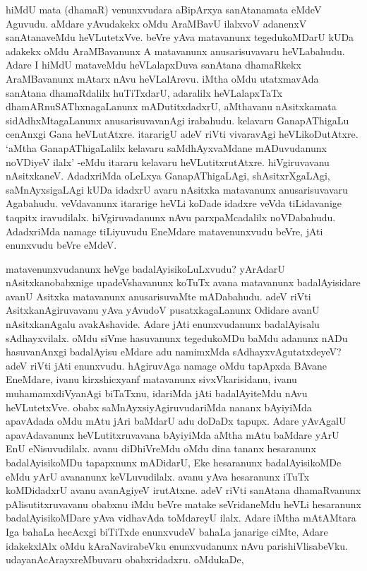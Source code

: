 hiMdU mata (dhamaR) venunxvudara aBipArxya sanAtanamata eMdeV Aguvudu. aMdare yAvudakekx oMdu AraMBavU ilalxvoV adanenxV sanAtanaveMdu heVLutetxVve. beVre yAva matavanunx tegedukoMDarU kUDa adakekx oMdu AraMBavanunx A matavanunx anusarisuvavaru heVLabahudu. Adare I hiMdU mataveMdu heVLalapxDuva sanAtana dhamaRkekx AraMBavanunx mAtarx nAvu heVLalArevu. iMtha oMdu utatxmavAda sanAtana dhamaRdalilx huTiTxdarU, adaralilx heVLalapxTaTx dhamARnuSAThxnagaLanunx mADutitxdadxrU, aMthavanu nAsitxkamata sidAdhxMtagaLanunx anusarisuvavanAgi irabahudu. kelavaru GanapAThigaLu cenAnxgi Gana heVLutAtxre. itararigU adeV riVti vivaravAgi heVLikoDutAtxre. `aMtha GanapAThigaLalilx kelavaru saMdhAyxvaMdane mADuvudanunx noVDiyeV ilalx' -eMdu itararu kelavaru heVLutitxrutAtxre. hiVgiruvavanu nAsitxkaneV. AdadxriMda oLeLxya GanapAThigaLAgi, shAsitxrXgaLAgi, saMnAyxsigaLAgi kUDa idadxrU avaru nAsitxka matavanunx anusarisuvavaru Agabahudu. veVdavanunx itararige heVLi koDade idadxre veVda tiLidavanige taqpitx iravudilalx. hiVgiruvadanunx nAvu parxpaMcadalilx noVDabahudu. AdadxriMda namage tiLiyuvudu EneMdare matavenunxvudu beVre, jAti enunxvudu beVre eMdeV.

matavenunxvudanunx heVge badalAyisikoLuLxvudu? yArAdarU nAsitxkanobabxnige upadeVshavanunx koTuTx avana matavanunx badalAyisidare avanU Asitxka matavanunx anusarisuvaMte mADabahudu. adeV riVti AsitxkanAgiruvavanu yAva yAvudoV pusatxkagaLanunx Odidare avanU nAsitxkanAgalu avakAshavide. Adare jAti enunxvudanunx badalAyisalu sAdhayxvilalx. oMdu siVme hasuvanunx tegedukoMDu baMdu adanunx nADu hasuvanAnxgi badalAyisu eMdare adu namimxMda sAdhayxvAgutatxdeyeV? adeV riVti jAti enunxvudu. hAgiruvAga namage oMdu tapApxda BAvane EneMdare, ivanu kirxshicxyanf matavanunx sivxVkarisidanu, ivanu muhamamxdiVyanAgi biTaTxnu, idariMda jAti badalAyiteMdu nAvu heVLutetxVve. obabx saMnAyxsiyAgiruvudariMda nananx bAyiyiMda apavAdada oMdu mAtu jAri baMdarU adu doDaDx tapupx. Adare yAvAgalU apavAdavanunx heVLutitxruvavana bAyiyiMda aMtha mAtu baMdare yArU EnU eNisuvudilalx. avanu diDhiVreMdu oMdu dina tananx hesaranunx badalAyisikoMDu tapapxnunx mADidarU, Eke hesaranunx badalAyisikoMDe eMdu yArU avananunx keVLuvudilalx. avanu yAva hesaranunx iTuTx koMDidadxrU avanu avanAgiyeV irutAtxne. adeV riVti sanAtana dhamaRvanunx pAlisutitxruvavanu obabxnu iMdu beVre matake seVridaneMdu heVLi hesaranunx badalAyisikoMDare yAva vidhavAda toMdareyU ilalx. Adare iMtha mAtAMtara Iga bahaLa hecAcxgi biTiTxde enunxvudeV bahaLa janarige ciMte, Adare idakekxlAlx oMdu kAraNavirabeVku enunxvudanunx nAvu parishiVlisabeVku. udayanAcArayxreMbuvaru obabxridadxru. oMdukaDe,

